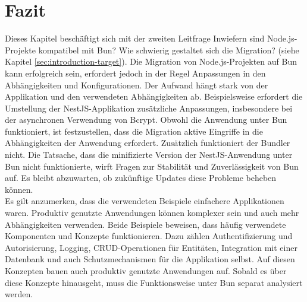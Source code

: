 \section{Fazit} \label{sec:compabitility-conclusion}
Dieses Kapitel beschäftigt sich mit der zweiten Leitfrage \glqq Inwiefern sind Node.js-Projekte kompatibel mit Bun? Wie schwierig gestaltet sich die Migration?\grqq{} (siehe Kapitel \ref{sec:introduction-target}). Die Migration von Node.js-Projekten auf Bun kann erfolgreich sein, erfordert jedoch in der Regel Anpassungen in den Abhängigkeiten und Konfigurationen. Der Aufwand hängt stark von der Applikation und den verwendeten Abhängigkeiten ab. Beispielsweise erfordert die Umstellung der NestJS-Applikation zusätzliche Anpassungen, insbesondere bei der asynchronen Verwendung von Bcrypt. Obwohl die Anwendung unter Bun funktioniert, ist festzustellen, dass die Migration aktive Eingriffe in die Abhängigkeiten der Anwendung erfordert. Zusätzlich funktioniert der Bundler nicht.  Die Tatsache, dass die minifizierte Version der NestJS-Anwendung unter Bun nicht funktionierte, wirft Fragen zur Stabilität und Zuverlässigkeit von Bun auf. Es bleibt abzuwarten, ob zukünftige Updates diese Probleme beheben können.\\

\noindent
Es gilt anzumerken, dass die verwendeten Beispiele einfachere Applikationen waren. Produktiv genutzte Anwendungen können komplexer sein und auch mehr Abhängigkeiten verwenden. Beide Beispiele beweisen, dass häufig verwendete Komponenten und Konzepte funktionieren. Dazu zählen Authentifizierung und Autorisierung, Logging, CRUD-Operationen für Entitäten, Integration mit einer Datenbank und auch Schutzmechanismen für die Applikation selbst. Auf diesen Konzepten bauen auch produktiv genutzte Anwendungen auf. Sobald es über diese Konzepte hinausgeht, muss die Funktionsweise unter Bun separat analysiert werden.
